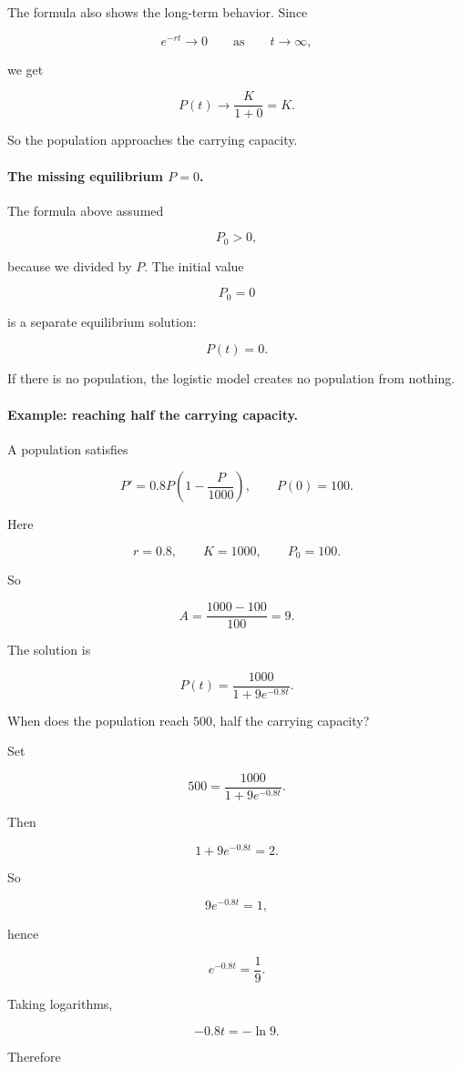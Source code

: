 The formula also shows the long-term behavior.  Since

\[
e^{-rt}\to0
\qquad\text{as}\qquad t\to\infty,
\]

we get

\[
P(t)\to\frac{K}{1+0}=K.
\]

So the population approaches the carrying capacity.

\paragraph{The missing equilibrium \(P=0\).}
The formula above assumed

\[
P_0>0,
\]

because we divided by \(P\).  The initial value

\[
P_0=0
\]

is a separate equilibrium solution:

\[
P(t)=0.
\]

If there is no population, the logistic model creates no population from nothing.

\paragraph{Example: reaching half the carrying capacity.}
A population satisfies

\[
P'=0.8P\left(1-\frac{P}{1000}\right),
\qquad
P(0)=100.
\]

Here

\[
r=0.8,
\qquad
K=1000,
\qquad
P_0=100.
\]

So

\[
A=\frac{1000-100}{100}=9.
\]

The solution is

\[
P(t)=\frac{1000}{1+9e^{-0.8t}}.
\]

When does the population reach \(500\), half the carrying capacity?

Set

\[
500=\frac{1000}{1+9e^{-0.8t}}.
\]

Then

\[
1+9e^{-0.8t}=2.
\]

So

\[
9e^{-0.8t}=1,
\]

hence

\[
e^{-0.8t}=\frac19.
\]

Taking logarithms,

\[
-0.8t=-\ln9.
\]

Therefore

